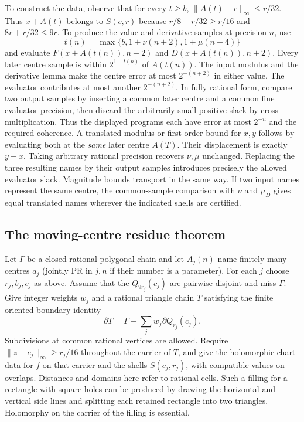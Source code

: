 To construct the data, observe that for every $t\ge b$,
$\lVert A(t)-c\rVert_\infty\le r/32$. Thus $x+A(t)$ belongs to $S(c,r)$
because $r/8-r/32\ge r/16$ and $8r+r/32\le9r$. To produce the value
and derivative samples at precision $n$, use
\[
 t(n)=\max\{b,1+\nu(n+2),1+\mu(n+4)\}
\]
and evaluate $F(x+A(t(n)),n+2)$ and $D(x+A(t(n)),n+2)$.
Every later centre sample is within $2^{1-t(n)}$ of $A(t(n))$.
The input modulus and the derivative lemma make the centre error at
most $2^{-(n+2)}$ in either value. The evaluator contributes at most
another $2^{-(n+2)}$. In fully rational form, compare two output
samples by inserting a common later centre and a common fine evaluator
precision, then discard the arbitrarily small positive slack by
cross-multiplication. Thus the displayed programs each have error
at most $2^{-n}$ and the required coherence. A translated modulus or
first-order bound for $x,y$ follows by evaluating both at the \emph{same}
later centre $A(T)$. Their displacement is exactly $y-x$. Taking
arbitrary rational precision recovers $\nu,\mu$ unchanged. Replacing
the three resulting names by their output samples introduces precisely
the allowed evaluator slack. Magnitude bounds transport in the same
way. If two input names represent the same centre, the common-sample
comparison with $\nu$ and $\mu_D$ gives equal translated names wherever
the indicated shells are certified.

\subsection{The moving-centre residue theorem}

Let $\Gamma$ be a closed rational polygonal chain and let $A_j(n)$
name finitely many centres $a_j$ (jointly PR in $j,n$ if their number is
a parameter). For each $j$ choose $r_j,b_j,c_j$ as above.
Assume that the $Q_{9r_j}(c_j)$ are pairwise disjoint and miss $\Gamma$.
Give integer weights $w_j$ and a rational triangle chain $T$ satisfying
the finite oriented-boundary identity
\[
 \partial T=\Gamma-\sum_j w_j\partial Q_{r_j}(c_j).
\]
Subdivisions at common rational vertices are allowed. Require
$\lVert z-c_j\rVert_\infty\ge r_j/16$ throughout the carrier of $T$,
and give the holomorphic chart data for $f$ on that carrier and
the shells $S(c_j,r_j)$, with compatible values on overlaps.
Distances and domains here refer to rational cells. Such a filling for
a rectangle with square holes can be produced by drawing the horizontal
and vertical side lines and splitting each retained rectangle into
two triangles. Holomorphy on the carrier of the filling is essential.

